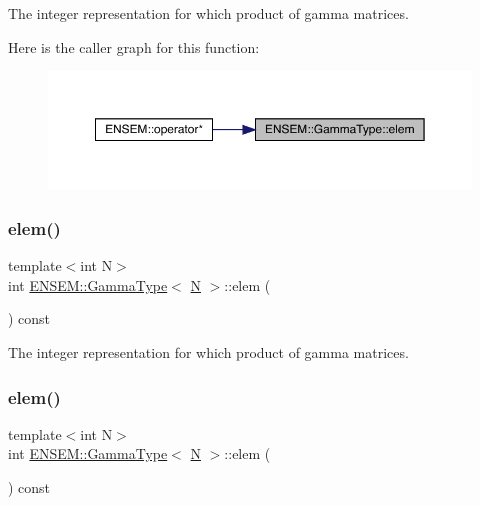 The integer representation for which product of gamma matrices. 

Here is the caller graph for this function\+:
\nopagebreak
\begin{figure}[H]
\begin{center}
\leavevmode
\includegraphics[width=350pt]{d6/d50/classENSEM_1_1GammaType_a2813c3878cd269c7a37c588875682705_icgraph}
\end{center}
\end{figure}
\mbox{\label{classENSEM_1_1GammaType_a2813c3878cd269c7a37c588875682705}} 
\subsubsection{\texorpdfstring{elem()}{elem()}\hspace{0.1cm}{\footnotesize\ttfamily [2/3]}}
{\footnotesize\ttfamily template$<$int N$>$ \\
int \mbox{\hyperlink{classENSEM_1_1GammaType}{E\+N\+S\+E\+M\+::\+Gamma\+Type}}$<$ \mbox{\hyperlink{adat__devel_2lib_2hadron_2operator__name__util_8cc_a7722c8ecbb62d99aee7ce68b1752f337}{N}} $>$\+::elem (\begin{DoxyParamCaption}{ }\end{DoxyParamCaption}) const\hspace{0.3cm}{\ttfamily [inline]}}



The integer representation for which product of gamma matrices. 

\mbox{\label{classENSEM_1_1GammaType_a2813c3878cd269c7a37c588875682705}} 
\subsubsection{\texorpdfstring{elem()}{elem()}\hspace{0.1cm}{\footnotesize\ttfamily [3/3]}}
{\footnotesize\ttfamily template$<$int N$>$ \\
int \mbox{\hyperlink{classENSEM_1_1GammaType}{E\+N\+S\+E\+M\+::\+Gamma\+Type}}$<$ \mbox{\hyperlink{adat__devel_2lib_2hadron_2operator__name__util_8cc_a7722c8ecbb62d99aee7ce68b1752f337}{N}} $>$\+::elem (\begin{DoxyParamCaption}{ }\end{DoxyParamCaption}) const\hspace{0.3cm}{\ttfamily [inline]}}



